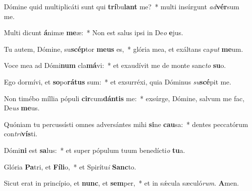 \item Dómine quid multiplicáti sunt qui \textbf{trí}bu\textbf{lant} me?~* multi insúrgunt \textit{ad}\textbf{vér}sum me.
\item Multi dicunt \textbf{á}nimæ \textbf{me}æ:~* Non est salus ipsi in De\textit{o} \textbf{e}jus.
\item Tu autem, Dómine, su\textbf{scép}tor \textbf{me}\textbf{us} es,~* glória mea, et exáltans ca\textit{put} \textbf{me}um.
\item Voce mea ad Dómi\textbf{num} cla\textbf{má}vi:~* et exaudívit me de monte sanc\textit{to} \textbf{su}o.
\item Ego dormívi, et \textbf{so}po\textbf{rá}\textbf{tus} sum:~* et exsurréxi, quia Dóminus \textit{su}\textbf{scé}pit me.
\item Non timébo míllia pópuli \textbf{cir}cum\textbf{dán}\textbf{tis} me:~* exsúrge, Dómine, salvum me fac, De\textit{us} \textbf{me}us.
\item Quóniam tu percussísti omnes adversántes mihi \textbf{si}ne \textbf{cau}sa:~* dentes peccatórum con\textit{tri}\textbf{vís}ti.
\item Dómi\textbf{ni} est \textbf{sa}lus:~* et super pópulum tuum benedícti\textit{o} \textbf{tu}a.
\item Glória \textbf{Pa}tri, et \textbf{Fí}\textbf{li}o,~* et Spirítu\textit{i} \textbf{Sanc}to.
\item Sicut erat in princípio, et \textbf{nunc}, et \textbf{sem}per,~* et in sǽcula sæculó\textit{rum}. \textbf{A}men.
